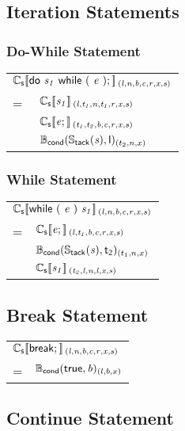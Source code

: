 \documentclass[a4j]{jsarticle}
\newcommand{\lb}{[\![}				%
\newcommand{\rb}{]\!]}				%
\newcommand{\db}[1]{\lb#1\rb}			%
\newcommand{\den}[2]{{#1}\db{#2}\,}
\newcommand{\defC}[3]{\den{#1}{\sf #2}_{\it #3}}
\newcommand{\Cs}{\defC{\mathbb{C}_{\sf s}}}
\newcommand{\Stack}[1]{\mathbb{S}_{\sf tack}(#1)}
\newcommand{\defB}[3]{{#1}({\sf #2})_{#3}}
\newcommand{\Bcond}{\defB{\mathbb{B}_{\sf cond}}}
\newcommand{\var}[1]{{\it #1}}
\begin{document}
\subsection{Iteration Statements}

\subsubsection{Do-While Statement}

\begin{tabular}{ll}
\multicolumn{2}{l}{
	$ \Cs{ do\ \var{s_1}\ while\ (\ \var{e}\ ); }{(l, n, b, c, r, x, s)} $
}  \\
=  &  $ \Cs{ \var{s_1} }{(l, t_1, n, t_1, r, x, s)}  $ \\
   &  $ \Cs{ \var{e}; }{(t_1, t_2, b, c, r, x, s)} $ \\
   &  $ \Bcond{ \Stack{\var{s}}, l }{(t_2, n, x)}  $
\end{tabular}


\subsubsection{While Statement}

\begin{tabular}{ll}
\multicolumn{2}{l}{
	$ \Cs{ while\ (\ \var{e}\ )\ \var{s_1} }{(l, n, b, c, r, x, s)} $
}  \\
=  &  $ \Cs{ \var{e}; }{(l, t_1, b, c, r, x, s)}    $ \\
   &  $ \Bcond{ \Stack{\var{s}}, t_2 }{(t_1, n, x)} $ \\
   &  $ \Cs{ \var{s_1} }{(t_2, l, n, l, x, s)}        $
\end{tabular}



\subsection{Break Statement}

\begin{tabular}{ll}
\multicolumn{2}{l}{
	$ \Cs{ break; }{(l, n, b, c, r, x, s)} $
}  \\
=  &  $ \Bcond{ true, \var{b} }{(l, b, x)}    $
\end{tabular}



\subsection{Continue Statement}
\end{document}
